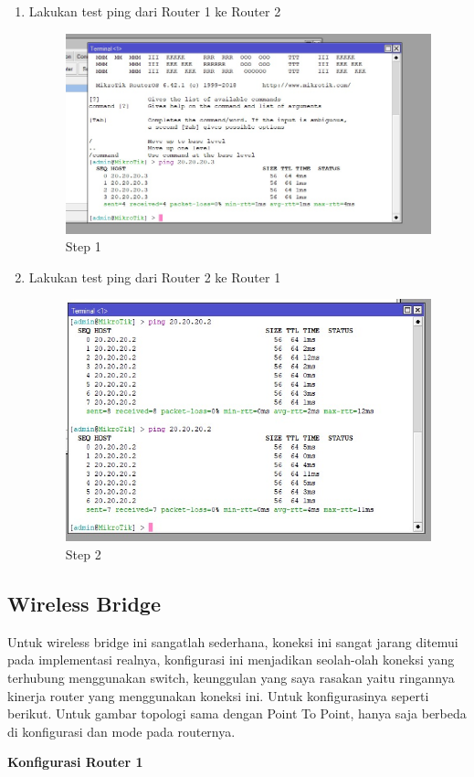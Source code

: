 \begin{enumerate}
	\item Lakukan test ping dari Router 1 ke Router 2
	\begin{figure}[H]
		\centering
		\includegraphics[width=0.5\linewidth]{P1/img/hasilper2pc1.jpg}
		\caption{Step 1}
		\label{fig:gambar14}
	\end{figure}

	\item Lakukan test ping dari Router 2 ke Router 1
	\begin{figure}[H]
		\centering
		\includegraphics[width=0.5\linewidth]{P1/img/hasilper2pc2.jpg}
		\caption{Step 2}
		\label{fig:gambar15}
	\end{figure}

\end{enumerate}

\subsection{Wireless Bridge}
Untuk wireless bridge ini sangatlah sederhana, koneksi ini sangat jarang ditemui pada implementasi realnya, konfigurasi ini menjadikan seolah-olah koneksi yang terhubung menggunakan switch,
keunggulan yang saya rasakan yaitu ringannya kinerja router yang menggunakan koneksi ini. Untuk konfigurasinya seperti berikut. Untuk gambar topologi sama dengan Point To Point, hanya saja
berbeda di konfigurasi dan mode pada routernya.

\begin{center} 
	\textbf{Konfigurasi Router 1}
\end{center}

